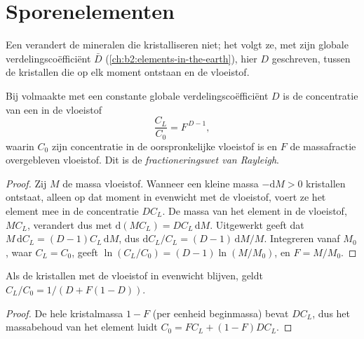 \section{Sporenelementen}\label{sec:b2:magmatic-differentiation:trace}

Een  verandert de mineralen die kristalliseren niet; het volgt ze,
met zijn globale verdelingscoëfficiënt $\bar D$ (\cref{ch:b2:elements-in-the-earth}),
hier $D$ geschreven, tussen de kristallen die op elk moment ontstaan en de vloeistof.

\begin{theorem}\label{thm:b2:magmatic-differentiation:rayleigh}
Bij volmaakte  met een constante globale verdelingscoëfficiënt
$D$ is de concentratie van een  in de vloeistof
\[
\frac{C_L}{C_0} = F^{\,D-1},
\]
waarin $C_0$ zijn concentratie in de oorspronkelijke vloeistof is en $F$ de massafractie
overgebleven vloeistof. Dit is de
\emph{fractioneringswet van Rayleigh}.
\end{theorem}

\begin{proof}
Zij $M$ de massa vloeistof. Wanneer een kleine massa $-\mathrm dM > 0$ kristallen
ontstaat, alleen op dat moment in evenwicht met de vloeistof, voert ze het element mee in de
concentratie $DC_L$. De massa van het element in de vloeistof, $MC_L$, verandert dus
met $\mathrm d(MC_L) = DC_L\,\mathrm dM$. Uitgewerkt geeft dat $M\,\mathrm dC_L = (D-1)C_L\,
\mathrm dM$, dus $\mathrm dC_L/C_L = (D-1)\,\mathrm dM/M$. Integreren vanaf $M_0$,
waar $C_L = C_0$, geeft $\ln(C_L/C_0) = (D-1)\ln(M/M_0)$, en $F = M/M_0$.
\end{proof}

\begin{proposition}
\label{prop:b2:magmatic-differentiation:equilibrium}
Als de kristallen met de vloeistof in evenwicht blijven, geldt $C_L/C_0 = 1/(D + F(1-D))$.
\end{proposition}

\begin{proof}
De hele kristalmassa $1-F$ (per eenheid beginmassa) bevat $DC_L$, dus het
massabehoud van het element luidt $C_0 = FC_L + (1-F)DC_L$.
\end{proof}

